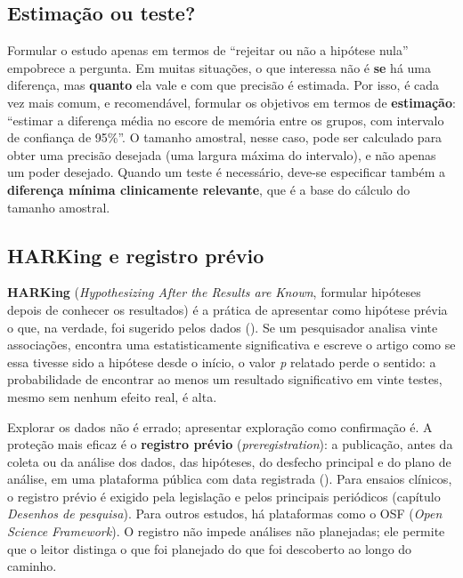 \documentclass[
]{book}
\begin{document}
\subsection{Estimação ou teste?}\label{estimauxe7uxe3o-ou-teste}

Formular o estudo apenas em termos de ``rejeitar ou não a hipótese nula'' empobrece a pergunta. Em muitas situações, o que interessa não é \textbf{se} há uma diferença, mas \textbf{quanto} ela vale e com que precisão é estimada. Por isso, é cada vez mais comum, e recomendável, formular os objetivos em termos de \textbf{estimação}: ``estimar a diferença média no escore de memória entre os grupos, com intervalo de confiança de 95\%''. O tamanho amostral, nesse caso, pode ser calculado para obter uma precisão desejada (uma largura máxima do intervalo), e não apenas um poder desejado. Quando um teste é necessário, deve-se especificar também a \textbf{diferença mínima clinicamente relevante}, que é a base do cálculo do tamanho amostral.

\subsection{HARKing e registro prévio}\label{harking-e-registro-pruxe9vio}

\textbf{HARKing} (\emph{Hypothesizing After the Results are Known}, formular hipóteses depois de conhecer os resultados) é a prática de apresentar como hipótese prévia o que, na verdade, foi sugerido pelos dados (). Se um pesquisador analisa vinte associações, encontra uma estatisticamente significativa e escreve o artigo como se essa tivesse sido a hipótese desde o início, o valor \emph{p} relatado perde o sentido: a probabilidade de encontrar ao menos um resultado significativo em vinte testes, mesmo sem nenhum efeito real, é alta.

Explorar os dados não é errado; apresentar exploração como confirmação é. A proteção mais eficaz é o \textbf{registro prévio} (\emph{preregistration}): a publicação, antes da coleta ou da análise dos dados, das hipóteses, do desfecho principal e do plano de análise, em uma plataforma pública com data registrada (). Para ensaios clínicos, o registro prévio é exigido pela legislação e pelos principais periódicos (capítulo \emph{Desenhos de pesquisa}). Para outros estudos, há plataformas como o OSF (\emph{Open Science Framework}). O registro não impede análises não planejadas; ele permite que o leitor distinga o que foi planejado do que foi descoberto ao longo do caminho.
\end{document}
